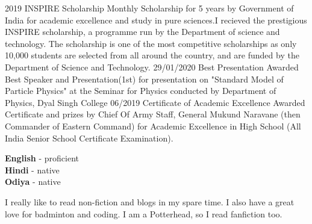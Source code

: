 \documentclass[9pt]{developercv} %
\begin{document}

\begin{entrylist}
	\entry
		{2019}
		{INSPIRE Scholarship}
		{}
		{Monthly Scholarship for 5 years by Government of India for academic excellence and study in pure sciences.I recieved the prestigious INSPIRE scholarship, a programme run by the Department of science and technology. The scholarship is one of the most competitive scholarships as only 10,000 students are selected from all around the country, and are funded by the Department of Science and Technology.}
	\entry
		{29/01/2020}
		{Best Presentation}
		{}
		{Awarded Best Speaker and Presentation(1st) for presentation on "Standard Model of Particle Physics" at the Seminar for Physics conducted by Department of Physics, Dyal Singh College}
	\entry
		{06/2019}
		{Certificate of Academic Excellence}
		{}
		{Awarded Certificate and prizes by Chief Of Army Staff, General Mukund Naravane (then Commander of Eastern Command) for Academic Excellence in High School (All India Senior School Certificate Examination).}
\end{entrylist}




\begin{minipage}[t]{0.5\textwidth}
	\vspace{-\baselineskip} %

	
	\textbf{English} - proficient\\
	\textbf{Hindi} - native\\
	\textbf{Odiya} - native
\end{minipage}
\hfill
\begin{minipage}[t]{0.5\textwidth}
	\vspace{-\baselineskip} %
	
	
	I really like to read non-fiction and blogs in my spare time. I also have a great love for badminton and coding. I am a Potterhead, so I read fanfiction too.  
\end{minipage}
	
\end{document}
